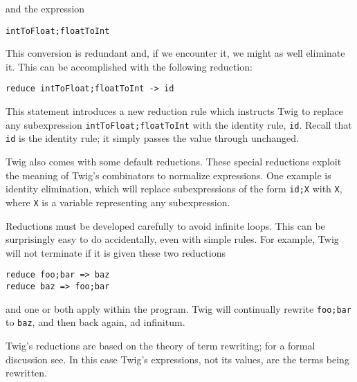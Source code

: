 and the expression

\begin{verbatim}
intToFloat;floatToInt
\end{verbatim}

This conversion is redundant and, if we encounter it, we might as well eliminate it. This can be accomplished with the following reduction:

\begin{verbatim}
reduce intToFloat;floatToInt -> id
\end{verbatim}

This statement introduces a new reduction rule which instructs Twig to replace any subexpression \texttt{intToFloat;floatToInt} with the identity rule, \texttt{id}. Recall that \texttt{id} is the identity rule; it simply passes the value through unchanged.

Twig also comes with some default reductions. These special reductions exploit the meaning of Twig's combinators to normalize expressions. One example is identity elimination, which will replace subexpressions of the form \texttt{id;X} with \texttt{X}, where \texttt{X} is a variable representing any subexpression.

Reductions must be developed carefully to avoid infinite loops. This can be surprisingly easy to do accidentally, even with simple rules. For example, Twig will not terminate if it is given these two reductions

\begin{verbatim}
reduce foo;bar => baz
reduce baz => foo;bar
\end{verbatim}

and one or both apply within the program. Twig will continually rewrite \texttt{foo;bar} to \texttt{baz}, and then back again, ad infinitum.

Twig's reductions are based on the theory of term rewriting; for a formal discussion see\cite{baader98rewriting}. In this case Twig's expressions, not its values, are the terms being rewritten.
